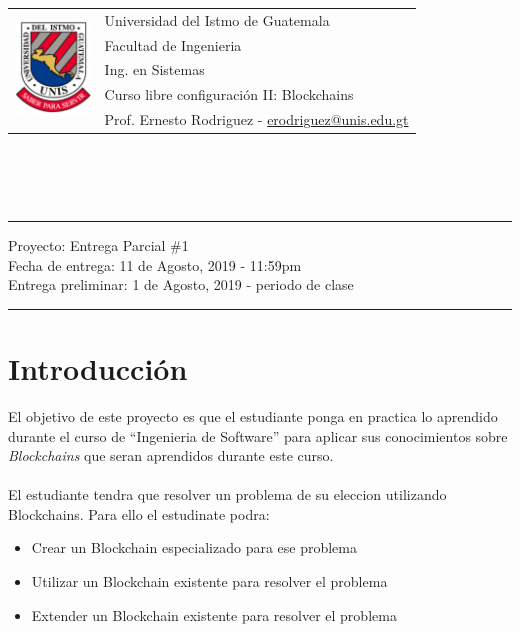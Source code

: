 \documentclass{article}
\newcommand{\horrule}[1]{\rule{\linewidth}{#1}}
\begin{document}
\begin{tabular}{l l}
\multirow{5}{*}{\includegraphics[width=2cm]{../recursos/logo.png}} & Universidad del Istmo de Guatemala \\
 & Facultad de Ingenieria \\
 & Ing. en Sistemas \\
 & Curso libre configuraci\'on II: Blockchains \\
 & Prof. Ernesto Rodriguez - \href{mailto:erodriguez@unis.edu.gt}{erodriguez@unis.edu.gt} \\
\end{tabular}
\\\\\\

\begin{center}
        \horrule{0.5pt}
        \huge{Proyecto: Entrega Parcial \#1} \\
        \large{Fecha de entrega: 11 de Agosto, 2019 - 11:59pm} \\
        {Entrega preliminar: 1 de Agosto, 2019 - periodo de clase}
        \horrule{1pt}
\end{center}

\section*{Introducci\'on}

El objetivo de este proyecto es que el estudiante ponga en practica lo aprendido
durante el curso de ``Ingenieria de Software'' para aplicar sus conocimientos sobre
\emph{Blockchains} que seran aprendidos durante este curso.
\\\\
El estudiante tendra que resolver un problema de su eleccion utilizando Blockchains.
Para ello el estudinate podra:
\begin{itemize}
        \item Crear un Blockchain especializado para ese problema
        \item Utilizar un Blockchain existente para resolver el problema
        \item Extender un Blockchain existente para resolver el problema
\end{itemize}
\end{document}
